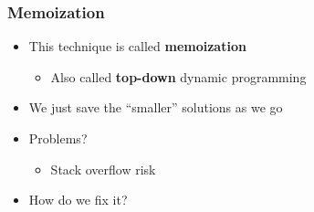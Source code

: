 \documentclass[t]{beamer}
\begin{document}
\begin{frame}

    \frametitle{Memoization}

    \begin{itemize}

        \item

        This technique is called \textbf{memoization}

        \pause

        \begin{itemize}

            \item

            Also called \textbf{top-down} dynamic programming

        \end{itemize}

        \pause

        \item

        We just save the ``smaller'' solutions as we go

        \pause

        \item

        Problems?

        \pause

        \begin{itemize}

            \item

            Stack overflow risk

        \end{itemize}

        \pause

        \item

        How do we fix it?

    \end{itemize}

\end{frame}
\end{document}
